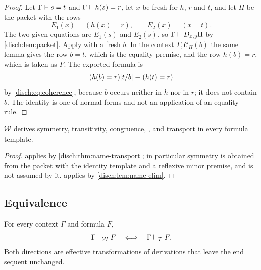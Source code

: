 \begin{proof}
Let $\Gamma\vdash s=t$ and $\Gamma\vdash h(s)=r$, let $x$ be fresh for
$h$, $r$ and $t$, and let $\Pi$ be the packet with the rows
\[
 E_1(x)=(h(x)=r),\qquad E_2(x)=(x=t).
\]
The two given equations are $E_1(s)$ and $E_2(s)$, so
$\Gamma\vdash D_{x,y}\Pi$ by \cref{disch:lem:packet}. Apply
 with a fresh $b$. In the context $\Gamma,\mathcal C_\Pi(b)$
the same lemma gives the row $b=t$, which is the equality premise, and the
row $h(b)=r$, which is taken as $F$. The exported formula is
\[
 (h(b)=r)[t/b]\equiv(h(t)=r)
\]
by \eqref{disch:eq:coherence}, because $b$ occurs neither in $h$ nor in
$r$; it does not contain $b$. The identity is one of normal forms and not
an application of an equality rule.
\end{proof}

\begin{corollary}
\label{disch:cor:name-equality}
$\mathcal W$ derives symmetry, transitivity, congruence, , and
transport in every formula template.
\end{corollary}

\begin{proof}
 applies by \cref{disch:thm:name-transport}; in
particular symmetry is obtained from the packet with the identity template
and a reflexive minor premise, and is not assumed by it.
 applies by \cref{disch:lem:name-elim}.
\end{proof}

\subsection{Equivalence}

\begin{theorem}
\label{disch:thm:name}
For every context $\Gamma$ and formula $F$,
\[
 \Gamma\vdash_{\mathcal W}F\quad\Longleftrightarrow\quad
 \Gamma\vdash_{\mathcal T}F .
\]
Both directions are effective transformations of derivations that leave
the end sequent unchanged.
\end{theorem}

